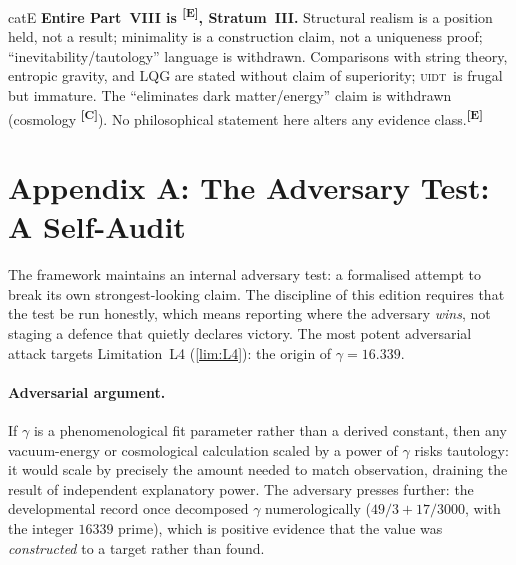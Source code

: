 \documentclass[12pt,a4paper,twoside]{article}
\theoremstyle{plain}
\theoremstyle{definition}
\theoremstyle{remark}
\newcommand{\UIDT}{\textsc{uidt}}
\newcommand{\catmark}[1]{\textsuperscript{\textsf{\textbf{[#1]}}}}
\newcommand{\GammaGeom}{16.339} %
\begin{document}
\begin{evidencebox}{catE}
\textbf{Entire Part~VIII is \catmark{E}, Stratum~III.} Structural realism is a position held, not a result; minimality is a construction claim, not a uniqueness proof; ``inevitability/tautology'' language is withdrawn. Comparisons with string theory, entropic gravity, and LQG are stated without claim of superiority; \UIDT\ is frugal but immature. The ``eliminates dark matter/energy'' claim is withdrawn (cosmology \catmark{C}). No philosophical statement here alters any evidence class.\catmark{E}
\end{evidencebox}

\newpage
\section*{Appendix A: The Adversary Test: A Self-Audit}
\label{app:adversary}

\noindent The framework maintains an internal adversary test: a formalised attempt to break its own strongest-looking claim. The discipline of this edition requires that the test be run honestly, which means reporting where the adversary \emph{wins}, not staging a defence that quietly declares victory. The most potent adversarial attack targets Limitation~L4 (\cref{lim:L4}): the origin of $\gamma = \GammaGeom$.

\paragraph{Adversarial argument.}
If $\gamma$ is a phenomenological fit parameter rather than a derived constant, then any vacuum-energy or cosmological calculation scaled by a power of $\gamma$ risks tautology: it would scale by precisely the amount needed to match observation, draining the result of independent explanatory power. The adversary presses further: the developmental record once decomposed $\gamma$ numerologically ($49/3 + 17/3000$, with the integer $16339$ prime), which is positive evidence that the value was \emph{constructed} to a target rather than found.
\end{document}
